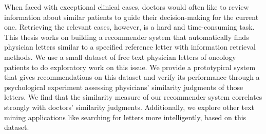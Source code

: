 \documentclass[Thesis.tex]{subfiles}
\begin{document}
\setlength{\parindent}{0cm}
When faced with exceptional clinical cases, doctors would often like to review information about similar patients to guide their decision-making for the current one. Retrieving the relevant cases, however, is a hard and time-consuming task. This thesis works on building a recommender system that automatically finds physician letters similar to a specified reference letter with information retrieval methods. We use a small dataset of free text physician letters of oncology patients to do exploratory work on this issue. We provide a prototypical system that gives recommendations on this dataset and verify its performance through a psychological experiment assessing physicians' similarity judgments of those letters. We find that the similarity measure of our recommender system correlates strongly with doctors' similarity judgments. Additionally, we explore other text mining applications like searching for letters more intelligently, based on this dataset.
\end{document}
